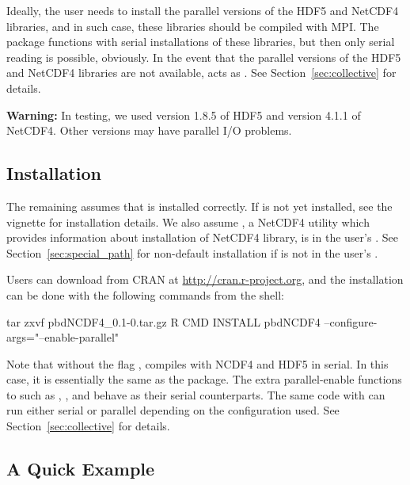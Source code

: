 Ideally, the user needs to install the parallel versions of the HDF5 and NetCDF4 libraries, and in such case, these libraries should be compiled with MPI.  The  package functions with serial installations of these libraries, but then only serial reading is possible, obviously.  In the event that the parallel versions of the HDF5 and NetCDF4 libraries are not available,  acts as . See Section~\ref{sec:collective} for details.

{\color{red} \bf Warning:}
In testing, we used version 1.8.5 of HDF5 and version 4.1.1 of NetCDF4.  Other versions may have parallel I/O problems.




\subsection[Installation]{Installation}
\label{sec:installation}

The remaining assumes that  is installed correctly.
If  is not yet installed, see the 
vignette for installation details.
We also assume , a NetCDF4 utility which provides information about installation of NetCDF4 library, is in the user's .  See Section~\ref{sec:special_path} for non-default installation if  is not in the user's .

Users can download  from CRAN at
\url{http://cran.r-project.org}, and
the installation can be done with the following commands from the shell:
\begin{Command}
tar zxvf pbdNCDF4_0.1-0.tar.gz
R CMD INSTALL pbdNCDF4 --configure-args="--enable-parallel"
\end{Command}

Note that without the flag
,
 compiles with NCDF4 and HDF5 in serial.  In this case, it is essentially the same as the  package.
The extra parallel-enable  functions to 
such as ,
, and  behave as their serial counterparts.
The same  code with 
can run either serial or parallel depending on the configuration used.
See Section~\ref{sec:collective} for details.


\subsection[A Quick Example]{A Quick Example}
\label{sec:quick_example}

